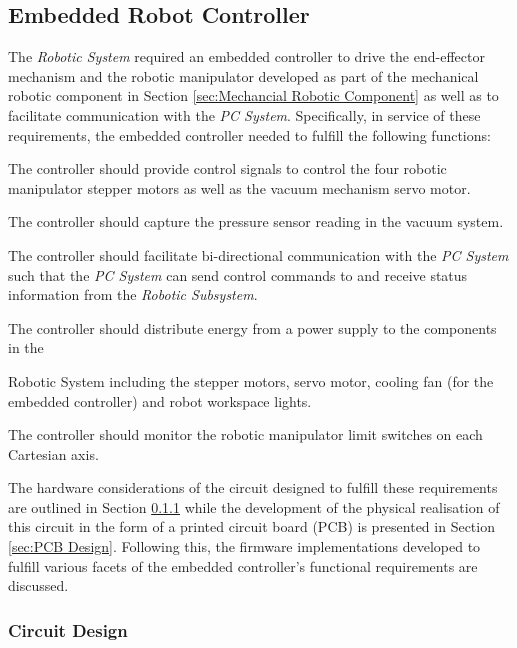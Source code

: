 \subsection{Embedded Robot Controller}

The \textit{Robotic System} required an embedded controller to drive the end-effector mechanism and the robotic manipulator developed as part of the mechanical robotic component in Section \ref{sec:Mechancial Robotic Component} as well as to facilitate communication with the \textit{PC System}. Specifically, in service of these requirements, the embedded controller needed to fulfill the following functions:

\begin{compactitem}
	\item The controller should provide control signals to control the four robotic manipulator stepper motors as well as the vacuum mechanism servo motor.
	\item The controller should capture the pressure sensor reading in the vacuum system.
	\item The controller should facilitate bi-directional communication with the \textit{PC System} such that the \textit{PC System} can send control commands to and receive status information from the \textit{Robotic Subsystem}.
	\item The controller should distribute energy from a power supply to the components in the \item Robotic System including the stepper motors, servo motor, cooling fan (for the embedded controller) and robot workspace lights.
	\item The controller should monitor the robotic manipulator limit switches on each Cartesian axis.
\end{compactitem}

The hardware considerations of the circuit designed to fulfill these requirements are outlined in Section \ref{sec:Circuit Design} while the development of the physical realisation of this circuit in the form of a printed circuit board (PCB) is presented in Section \ref{sec:PCB Design}. Following this, the firmware implementations developed to fulfill various facets of the embedded controller's functional requirements are discussed.

\subsubsection{Circuit Design} \label{sec:Circuit Design}

